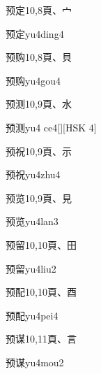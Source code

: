 \begin{Entry}{预定}{10,8}{⾴、⼧}
  \begin{Phonetics}{预定}{yu4ding4}
  \end{Phonetics}
\end{Entry}

\begin{Entry}{预购}{10,8}{⾴、⾙}
  \begin{Phonetics}{预购}{yu4gou4}
  \end{Phonetics}
\end{Entry}

\begin{Entry}{预测}{10,9}{⾴、⽔}
  \begin{Phonetics}{预测}{yu4 ce4}[][HSK 4]
  \end{Phonetics}
\end{Entry}

\begin{Entry}{预祝}{10,9}{⾴、⽰}
  \begin{Phonetics}{预祝}{yu4zhu4}
  \end{Phonetics}
\end{Entry}

\begin{Entry}{预览}{10,9}{⾴、⾒}
  \begin{Phonetics}{预览}{yu4lan3}
  \end{Phonetics}
\end{Entry}

\begin{Entry}{预留}{10,10}{⾴、⽥}
  \begin{Phonetics}{预留}{yu4liu2}
  \end{Phonetics}
\end{Entry}

\begin{Entry}{预配}{10,10}{⾴、⾣}
  \begin{Phonetics}{预配}{yu4pei4}
  \end{Phonetics}
\end{Entry}

\begin{Entry}{预谋}{10,11}{⾴、⾔}
  \begin{Phonetics}{预谋}{yu4mou2}
  \end{Phonetics}
\end{Entry}

